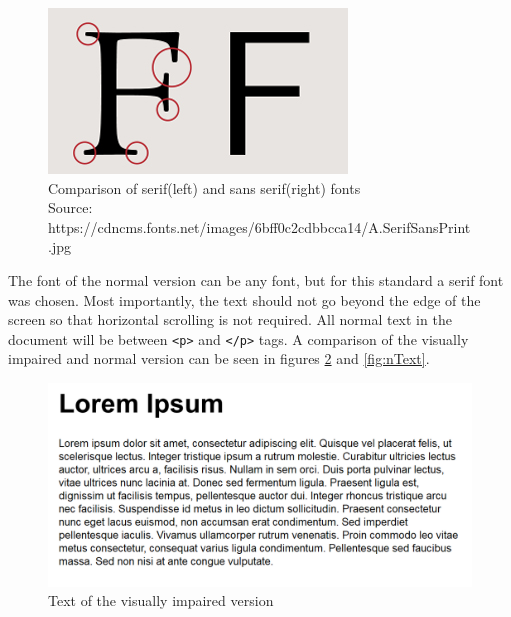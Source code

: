 \begin{figure}
	
	\begin{center}
		\includegraphics[width=\linewidth/2]{figures/sansSerif.jpg}
	\end{center}

	
	\caption{Comparison of serif(left) and sans serif(right) fonts
		\\Source: https://cdncms.fonts.net/images/6bff0c2cdbbcca14/A.SerifSansPrint.jpg}
	\label{fig:sansSerif}
\end{figure}

The font of the normal version can be any font, but for this standard a serif font was chosen. Most importantly, the text should not go beyond the edge of the screen so that horizontal scrolling is not required. All normal text in the document will be between \lstinline|<p>| and \lstinline|</p>| tags. A comparison of the visually impaired and normal version can be seen in figures \ref{fig:viText} and \ref{fig:nText}. 

\begin{figure}
	\includegraphics[width=\linewidth]{figures/VItext.png}	
	\caption{Text of the visually impaired version}
	\label{fig:viText}
\end{figure}

